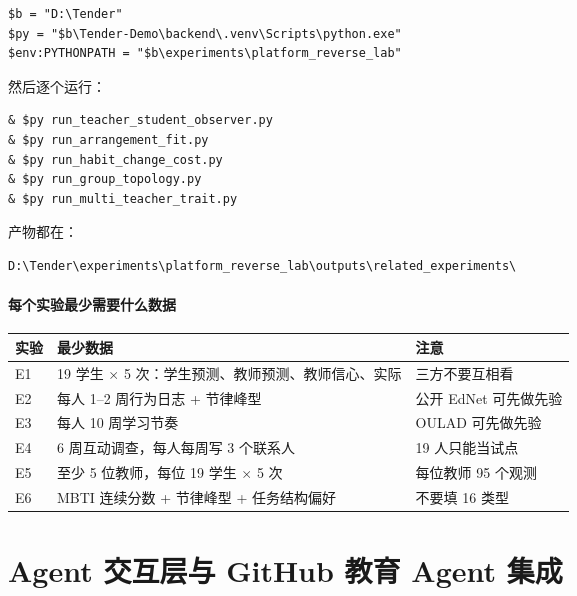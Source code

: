 \documentclass[UTF8,a4paper,11pt]{ctexart}
\begin{document}
\begin{verbatim}
$b = "D:\Tender"
$py = "$b\Tender-Demo\backend\.venv\Scripts\python.exe"
$env:PYTHONPATH = "$b\experiments\platform_reverse_lab"
\end{verbatim}

然后逐个运行：

\begin{verbatim}
& $py run_teacher_student_observer.py
& $py run_arrangement_fit.py
& $py run_habit_change_cost.py
& $py run_group_topology.py
& $py run_multi_teacher_trait.py
\end{verbatim}

产物都在：

\begin{verbatim}
D:\Tender\experiments\platform_reverse_lab\outputs\related_experiments\
\end{verbatim}

\subsection{每个实验最少需要什么数据}

\begin{center}
\begin{longtable}{@{}p{2.2cm}p{4.6cm}p{6.8cm}@{}}
\toprule
\textbf{实验} & \textbf{最少数据} & \textbf{注意} \\
\midrule
E1 & 19 学生 $\times$ 5 次：学生预测、教师预测、教师信心、实际 & 三方不要互相看 \\
E2 & 每人 1--2 周行为日志 + 节律峰型 & 公开 EdNet 可先做先验 \\
E3 & 每人 10 周学习节奏 & OULAD 可先做先验 \\
E4 & 6 周互动调查，每人每周写 3 个联系人 & 19 人只能当试点 \\
E5 & 至少 5 位教师，每位 19 学生 $\times$ 5 次 & 每位教师 95 个观测 \\
E6 & MBTI 连续分数 + 节律峰型 + 任务结构偏好 & 不要填 16 类型 \\
\bottomrule
\end{longtable}
\end{center}

\newpage



\part{Agent 交互层与 GitHub 教育 Agent 集成}
\end{document}
